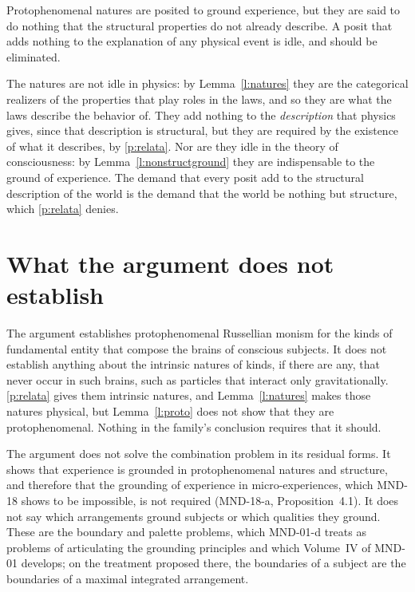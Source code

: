 \documentclass{situationist-preprint}
\begin{document}
\begin{objection}\label{o:idle}
Protophenomenal natures are posited to ground experience, but they are said to do nothing that the structural properties do not already describe. A posit that adds nothing to the explanation of any physical event is idle, and should be eliminated.
\end{objection}

\begin{reply}
The natures are not idle in physics: by Lemma~\ref{l:natures} they are the categorical realizers of the properties that play roles in the laws, and so they are what the laws describe the behavior of. They add nothing to the \emph{description} that physics gives, since that description is structural, but they are required by the existence of what it describes, by \ref{p:relata}. Nor are they idle in the theory of consciousness: by Lemma~\ref{l:nonstructground} they are indispensable to the ground of experience. The demand that every posit add to the structural description of the world is the demand that the world be nothing but structure, which \ref{p:relata} denies.
\end{reply}

\section{What the argument does not establish}\label{s:not}

The argument establishes protophenomenal Russellian monism for the kinds of fundamental entity that compose the brains of conscious subjects. It does not establish anything about the intrinsic natures of kinds, if there are any, that never occur in such brains, such as particles that interact only gravitationally. \ref{p:relata} gives them intrinsic natures, and Lemma~\ref{l:natures} makes those natures physical, but Lemma~\ref{l:proto} does not show that they are protophenomenal. Nothing in the family's conclusion requires that it should.

The argument does not solve the combination problem in its residual forms. It shows that experience is grounded in protophenomenal natures and structure, and therefore that the grounding of experience in micro-experiences, which MND-18 shows to be impossible, is not required (MND-18-a, Proposition~4.1). It does not say which arrangements ground subjects or which qualities they ground. These are the boundary and palette problems, which MND-01-d treats as problems of articulating the grounding principles and which Volume~IV of MND-01 develops; on the treatment proposed there, the boundaries of a subject are the boundaries of a maximal integrated arrangement.
\end{document}
